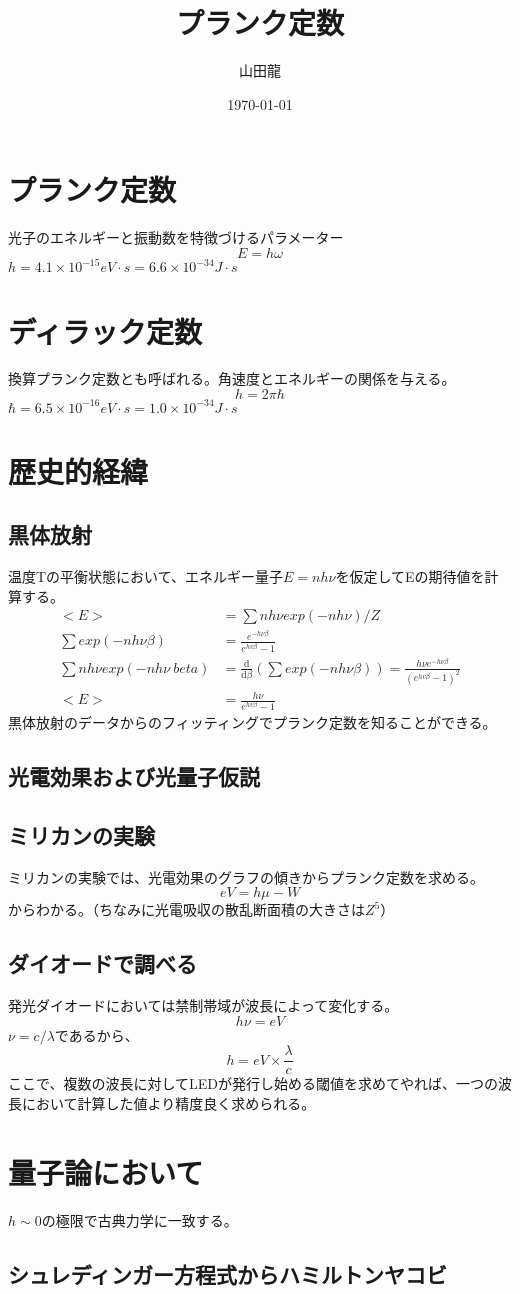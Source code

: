 \documentclass{jsarticle}
\date{\today}
\author{山田龍}
\title{プランク定数}
\newcommand{\dder}[2][]{\frac{\mathrm{d}#1}{\mathrm{d}#2}}
\newcommand{\beq}{\begin{equation}}
\newcommand{\eeq}{\end{equation}}
\begin{document}
\maketitle
\section{プランク定数}
光子のエネルギーと振動数を特徴づけるパラメーター
\beq
E = h \omega
\eeq
$h = 4.1 \times 10^{-15} eV \cdot s = 6.6 \times 10^{-34} J \cdot s$
\section{ディラック定数}
換算プランク定数とも呼ばれる。角速度とエネルギーの関係を与える。
\beq
h = 2 \pi \hbar
\eeq
$\hbar = 6.5 \times 10^{-16} eV \cdot s = 1.0 \times 10^{-34} J \cdot s$
\section{歴史的経緯}
\subsection{黒体放射}
温度Tの平衡状態において、エネルギー量子$E =nh\nu$を仮定してEの期待値を計算する。
\begin{align}
    <E> &= \sum nh\nu exp(- nh\nu) / Z\\
    \sum exp(- nh\nu \beta) &=  \frac{e^{-h\nu \beta}}{e^{hv \beta} - 1}\\
    \sum nh\nu exp(- nh\nu\ beta) &= \dder[]{\beta} (\sum exp(-nh\nu \beta)) = \frac{h\nu e^{-h\nu \beta}}{(e^{hv \beta} - 1)^2}\\
    <E> &= \frac{h\nu}{e^{hv \beta} - 1}
\end{align}
黒体放射のデータからのフィッティングでプランク定数を知ることができる。
\subsection{光電効果および光量子仮説}
\subsection{ミリカンの実験}
ミリカンの実験では、光電効果のグラフの傾きからプランク定数を求める。
\beq
eV = h\mu - W
\eeq
からわかる。（ちなみに光電吸収の散乱断面積の大きさは$Z^5$）
\subsection{ダイオードで調べる}
発光ダイオードにおいては禁制帯域が波長によって変化する。
\beq 
h \nu = eV
\eeq
$\nu = c / \lambda$であるから、
\beq
h = eV \times \frac{\lambda}{c}
\eeq
ここで、複数の波長に対してLEDが発行し始める閾値を求めてやれば、一つの波長において計算した値より精度良く求められる。
\section{量子論において}
$h \sim 0$の極限で古典力学に一致する。
\subsection{シュレディンガー方程式からハミルトンヤコビ}
\end{document}
